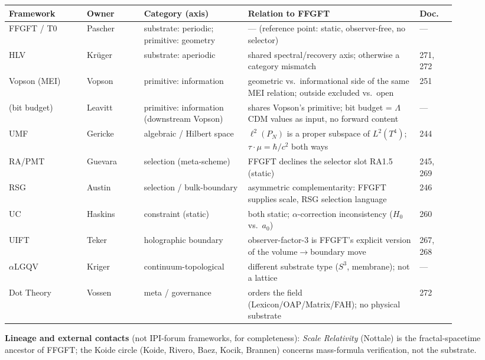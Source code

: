 \begin{center}
\footnotesize
\begin{tabular}{@{}p{0.155\linewidth}p{0.115\linewidth}p{0.205\linewidth}p{0.33\linewidth}p{0.07\linewidth}@{}}
\hline
\textbf{Framework} & \textbf{Owner} & \textbf{Category (axis)} & \textbf{Relation to FFGFT} & \textbf{Doc.}\\
\hline
FFGFT / T0 & Pascher & substrate: periodic; primitive: geometry & --- (reference point: static, observer-free, no selector) & ---\\
HLV & Krüger & substrate: aperiodic & shared spectral/recovery axis; otherwise a category mismatch & 271, 272\\
Vopson (MEI) & Vopson & primitive: information & geometric vs.\ informational side of the same MEI relation; outside excluded vs.\ open & 251\\
(bit budget) & Leavitt & primitive: information (downstream Vopson) & shares Vopson's primitive; bit budget = $\Lambda$CDM values as input, no forward content & ---\\
UMF & Gericke & algebraic / Hilbert space & $\ell^2(P_N)$ is a proper subspace of $L^2(T^4)$; $\tau\!\cdot\!\mu=\hbar/c^2$ both ways & 244\\
RA/PMT & Guevara & selection (meta-scheme) & FFGFT declines the selector slot RA1.5 (static) & 245, 269\\
RSG & Austin & selection / bulk-boundary & asymmetric complementarity: FFGFT supplies scale, RSG selection language & 246\\
UC & Haskins & constraint (static) & both static; $\alpha$-correction inconsistency ($H_0$ vs.\ $a_0$) & 260\\
UIFT & Teker & holographic boundary & observer-factor-3 is FFGFT's explicit version of the volume$\to$boundary move & 267, 268\\
$\alpha$LGQV & Kriger & continuum-topological & different substrate type ($S^3$, membrane); not a lattice & ---\\
Dot Theory & Vossen & meta / governance & orders the field (Lexicon/OAP/Matrix/FAH); no physical substrate & 272\\
\hline
\end{tabular}
\end{center}

\noindent\textbf{Lineage and external contacts} (not IPI-forum frameworks, for completeness):
\emph{Scale Relativity} (Nottale) is the fractal-spacetime ancestor of FFGFT; the Koide circle
(Koide, Rivero, Baez, Kocik, Brannen) concerns mass-formula verification, not the substrate.

